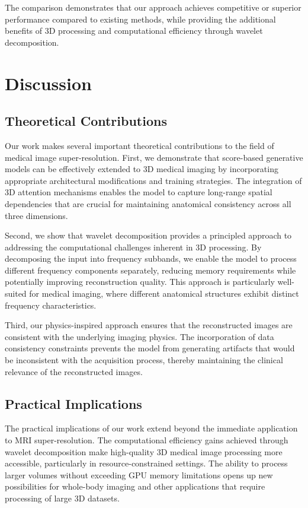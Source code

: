 \documentclass{midl} %
\begin{document}
The comparison demonstrates that our approach achieves competitive or superior performance compared to existing methods, while providing the additional benefits of 3D processing and computational efficiency through wavelet decomposition.

\section{Discussion}

\subsection{Theoretical Contributions}

Our work makes several important theoretical contributions to the field of medical image super-resolution. First, we demonstrate that score-based generative models can be effectively extended to 3D medical imaging by incorporating appropriate architectural modifications and training strategies. The integration of 3D attention mechanisms enables the model to capture long-range spatial dependencies that are crucial for maintaining anatomical consistency across all three dimensions.

Second, we show that wavelet decomposition provides a principled approach to addressing the computational challenges inherent in 3D processing. By decomposing the input into frequency subbands, we enable the model to process different frequency components separately, reducing memory requirements while potentially improving reconstruction quality. This approach is particularly well-suited for medical imaging, where different anatomical structures exhibit distinct frequency characteristics.

Third, our physics-inspired approach ensures that the reconstructed images are consistent with the underlying imaging physics. The incorporation of data consistency constraints prevents the model from generating artifacts that would be inconsistent with the acquisition process, thereby maintaining the clinical relevance of the reconstructed images.

\subsection{Practical Implications}

The practical implications of our work extend beyond the immediate application to MRI super-resolution. The computational efficiency gains achieved through wavelet decomposition make high-quality 3D medical image processing more accessible, particularly in resource-constrained settings. The ability to process larger volumes without exceeding GPU memory limitations opens up new possibilities for whole-body imaging and other applications that require processing of large 3D datasets.
\end{document}
